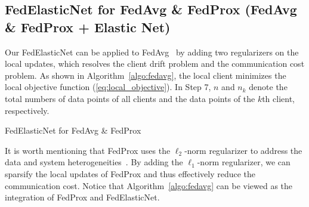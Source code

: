 \documentclass{article} %
\begin{document}
\subsection{FedElasticNet for FedAvg \& FedProx (FedAvg \& FedProx + Elastic Net)}  \label{section:fedavg} 

Our FedElasticNet can be applied to FedAvg~\citep{McMahan2017communication} by adding two regularizers on the local updates, which resolves the client drift problem and the communication cost problem. As shown in Algorithm~\ref{algo:fedavg}, the local client minimizes the local objective function (\ref{eq:local_objective}). In Step 7, $n$ and $n_k$ denote the total numbers of data points of all clients and the data points of the $k$th client, respectively. 

\begin{algorithm*}[t!]
    \caption{FedElasticNet for FedAvg \& FedProx}
    \label{algo:fedavg}
    
    \begin{algorithmic}[1]
    
    \ENDFORPAR
    \EndFor
\end{algorithmic}
\end{algorithm*}

It is worth mentioning that FedProx uses the $\ell_2$-norm regularizer to address the data and system heterogeneities~\citep{Li2020federated}. By adding the $\ell_1$-norm regularizer, we can sparsify the local updates of FedProx and thus effectively reduce the communication cost. Notice that Algorithm~\ref{algo:fedavg} can be viewed as the integration of FedProx and FedElasticNet. 




\end{document}
